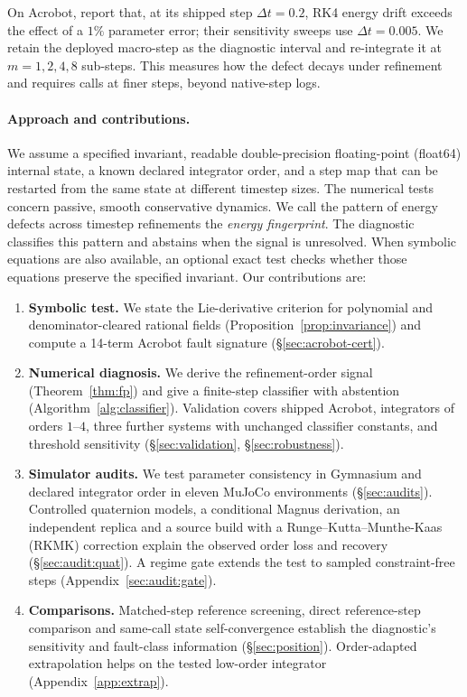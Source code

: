 \documentclass[10pt]{article}
\theoremstyle{definition}
\begin{document}
On Acrobot, \citet{gebrekidan2026diagnosing} report that, at its shipped step
$\Delta t=0.2$, RK4 energy drift exceeds the effect of a $1\%$ parameter error;
their sensitivity sweeps use $\Delta t=0.005$. We retain the deployed macro-step
as the diagnostic interval and re-integrate it at $m=1,2,4,8$ sub-steps. This
measures how the defect decays under refinement and requires calls at finer
steps, beyond native-step logs.

\paragraph{Approach and contributions.}
We assume a specified invariant, readable double-precision floating-point
(float64) internal state, a known declared integrator order, and a step map
that can be restarted from the same state at different timestep sizes.
The numerical tests concern passive, smooth conservative dynamics.
We call the pattern of energy defects across timestep refinements the
\emph{energy fingerprint}. The diagnostic classifies this pattern and
abstains when the signal is unresolved. When symbolic equations are also
available, an optional exact test checks whether those equations preserve
the specified invariant. Our contributions are:
\begin{enumerate}[label=(\alph*)]
  \item \textbf{Symbolic test.} We state the Lie-derivative criterion for
  polynomial and denominator-cleared rational fields
  (Proposition~\ref{prop:invariance}) and compute a 14-term Acrobot fault
  signature (\S\ref{sec:acrobot-cert}).
  \item \textbf{Numerical diagnosis.} We derive the refinement-order signal
  (Theorem~\ref{thm:fp}) and give a finite-step classifier with abstention
  (Algorithm~\ref{alg:classifier}). Validation covers shipped Acrobot,
  integrators of orders $1$--$4$, three further systems with unchanged
  classifier constants, and threshold sensitivity
  (\S\ref{sec:validation}, \S\ref{sec:robustness}).
  \item \textbf{Simulator audits.} We test parameter consistency in Gymnasium
  and declared integrator order in eleven MuJoCo environments
  (\S\ref{sec:audits}). Controlled quaternion models, a conditional Magnus
  derivation, an independent replica and a source build with a
  Runge--Kutta--Munthe-Kaas (RKMK) correction explain
  the observed order loss and recovery (\S\ref{sec:audit:quat}). A regime gate
  extends the test to sampled constraint-free steps (Appendix~\ref{sec:audit:gate}).
  \item \textbf{Comparisons.} Matched-step reference screening, direct
  reference-step comparison and same-call state self-convergence establish
  the diagnostic's sensitivity and fault-class information
  (\S\ref{sec:position}). Order-adapted extrapolation helps on the tested
  low-order integrator (Appendix~\ref{app:extrap}).
\end{enumerate}
\end{document}
